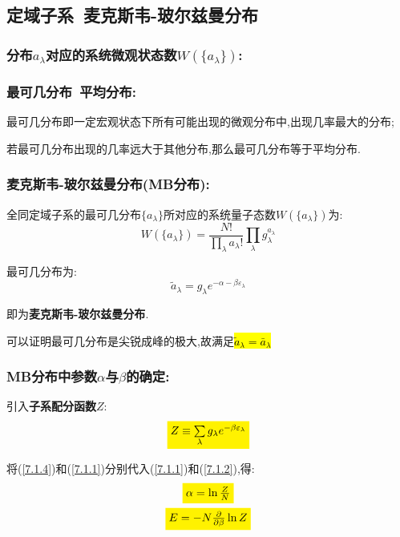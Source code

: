 \documentclass[12pt]{ctexart}
\newcommand{\mathcolorbox}[2]{\colorbox{#1}{$ #2$}}
\numberwithin{equation}{subsection}
\begin{document}
\subsection{定域子系\ 麦克斯韦-玻尔兹曼分布}
	\subsubsection{ 分布\texorpdfstring{$a_\lambda$}.对应的\textbf{系统微观状态数}\texorpdfstring{$W(\{a_\lambda\})$}.:}
	\subsubsection{ 最可几分布\ 平均分布:}
		最可几分布即一定宏观状态下所有可能出现的微观分布中,出现几率最大的分布;

		若最可几分布出现的几率远大于其他分布,那么最可几分布等于平均分布.
	\subsubsection{ 麦克斯韦-玻尔兹曼分布(MB分布):}
		全同定域子系的最可几分布$\{a_\lambda\}$所对应的系统量子态数$W(\{a_\lambda\})$为:
		\begin{equation}
		W\left( {\{ {a_\lambda }\} } \right) = \frac{{N!}}{{\prod\limits_\lambda  {{a_\lambda }!} }}\prod\limits_\lambda  {g_\lambda ^{{a_\lambda }}} 
		\end{equation}

		最可几分布为:
		\begin{equation}
		{\tilde a_\lambda } = {g_\lambda }{e^{ - \alpha  - \beta {\varepsilon _\lambda }}}\label{7.1.4}
		\end{equation}

		即为\textbf{麦克斯韦-玻尔兹曼分布}.

		可以证明最可几分布是尖锐成峰的极大,故满足\hl{${\tilde a_\lambda } = {\bar a_\lambda }$}
	\subsubsection{ MB分布中参数\texorpdfstring{$\alpha$}.与\texorpdfstring{$\beta$}.的确定:}
		引入\textbf{子系配分函数$Z$}:
		\begin{equation}
			\mathcolorbox{yellow}{Z \equiv \sum\limits_\lambda  {{g_\lambda }{e^{ - \beta {\varepsilon _\lambda }}}} \label{7.1.5}}
		\end{equation}

		将(\ref{7.1.4})和(\ref{7.1.1})分别代入(\ref{7.1.1})和(\ref{7.1.2}),得:
		\begin{gather}
			\mathcolorbox{yellow}{\alpha= \ln \frac{Z}{N}}\\
			\mathcolorbox{yellow}{E=-N\frac{\partial }{{\partial \beta }}\ln Z}
		\end{gather}








\end{document}
